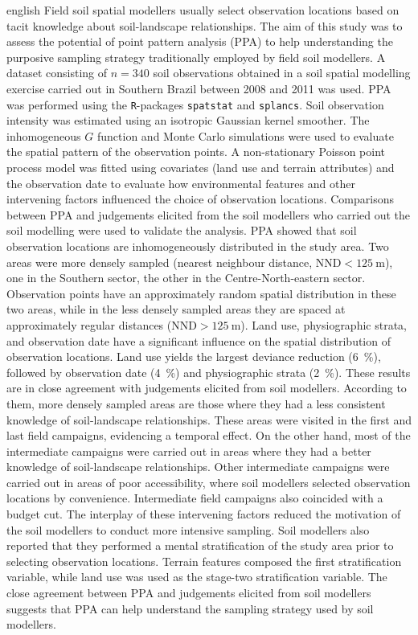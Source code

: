 \begin{chapterabstract}{english}{\enkeys}
Field soil spatial modellers usually select observation locations based on tacit knowledge about 
soil-landscape relationships. The aim of this study was to assess the potential of point pattern analysis 
(PPA) to help understanding the purposive sampling strategy traditionally employed by field soil modellers. A 
dataset consisting of $n = 340$ soil observations obtained in a soil spatial modelling exercise carried out in 
Southern Brazil between \num{2008} and \num{2011} was used. PPA was performed using the \texttt{R}-packages 
\texttt{spatstat} and \texttt{splancs}. Soil observation intensity was estimated using an isotropic Gaussian 
kernel smoother. The inhomogeneous $G$ function and Monte Carlo simulations were used to evaluate the spatial 
pattern of the observation points. A non-stationary Poisson point process model was fitted using covariates 
(land use and terrain attributes) and the observation date to evaluate how environmental features and other 
intervening factors influenced the choice of observation locations. Comparisons between PPA and judgements 
elicited from the soil modellers who carried out the soil modelling were used to validate the analysis. PPA 
showed that soil observation locations are inhomogeneously distributed in the study area. Two areas were more 
densely sampled (nearest neighbour distance, $\text{NND} < \SI{125}{\m}$), one in the Southern sector, 
the other in the Centre-North-eastern sector. Observation points have an approximately random spatial 
distribution in these two areas, while in the less densely sampled areas they are spaced at approximately 
regular distances ($\text{NND} > \SI{125}{\m}$). Land use, physiographic strata, and observation date have a 
significant influence on the spatial distribution of observation locations. Land use yields the largest 
deviance reduction (\SI{6}{\percent}), followed by observation date (\SI{4}{\percent}) and physiographic 
strata (\SI{2}{\percent}). These results are in close agreement with judgements elicited from soil modellers. 
According to them, more densely sampled areas are those where they had a less consistent knowledge of 
soil-landscape relationships. These areas were visited in the first and last field campaigns, evidencing a 
temporal effect. On the other hand, most of the intermediate campaigns were carried out in areas where they 
had a better knowledge of soil-landscape relationships. Other intermediate campaigns were carried out in areas 
of poor accessibility, where soil modellers selected observation locations by convenience. Intermediate field 
campaigns also coincided with a budget cut. The interplay of these intervening factors reduced the motivation 
of the soil modellers to conduct more intensive sampling. Soil modellers also reported that they performed a 
mental stratification of the study area prior to selecting observation locations. Terrain features composed 
the first stratification variable, while land use was used as the stage-two stratification variable. The close 
agreement between PPA and judgements elicited from soil modellers suggests that PPA can help understand the 
sampling strategy used by soil modellers.
\end{chapterabstract}

